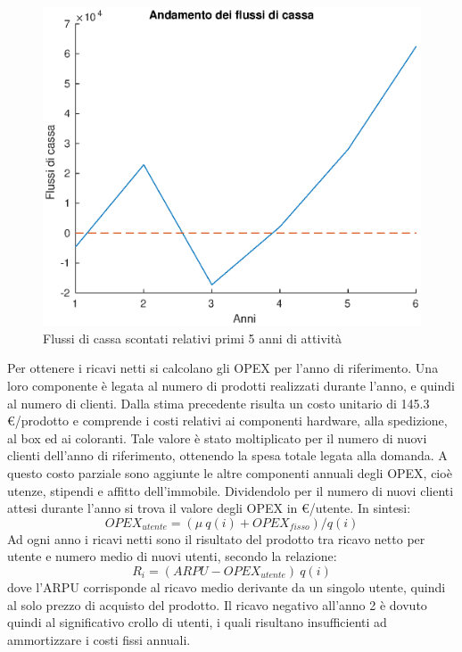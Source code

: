 
%
\begin{figure}[!h]
\centering
\includegraphics[width=\textwidth]{figures/cf}
\caption{Flussi di cassa scontati relativi primi 5 anni di attività}
\label{cf}
\end{figure}
%
Per ottenere i ricavi netti si calcolano gli OPEX per l’anno di riferimento.
Una loro componente è legata al numero di prodotti realizzati durante l’anno, e
quindi al numero di clienti. Dalla stima precedente risulta un costo unitario di
145.3 \euro/prodotto e comprende i costi relativi ai componenti hardware, alla
spedizione, al box ed ai coloranti. Tale valore è stato moltiplicato per il
numero di nuovi clienti dell’anno di riferimento, ottenendo la spesa totale
legata alla domanda.
A questo costo parziale sono aggiunte le altre componenti annuali degli OPEX,
cioè utenze, stipendi e affitto dell’immobile. Dividendolo per il numero di
nuovi clienti attesi durante l’anno si trova il valore degli OPEX in
\euro/utente. In sintesi:
\begin{displaymath}
	OPEX_{utente} = (\mu \ q(i) + OPEX_{fisso}) / q(i)
\end{displaymath}
Ad ogni anno i ricavi netti sono il risultato del prodotto tra ricavo netto per
utente e numero medio di nuovi utenti, secondo la relazione:
\begin{displaymath}
	R_i = (ARPU - OPEX_{utente}) \ q(i)
\end{displaymath}
dove l’ARPU corrisponde al ricavo medio derivante da un singolo utente, quindi
al solo prezzo di acquisto del prodotto.  Il ricavo negativo all’anno 2 è dovuto
quindi al significativo crollo di utenti, i quali risultano insufficienti ad
ammortizzare i costi fissi annuali.
